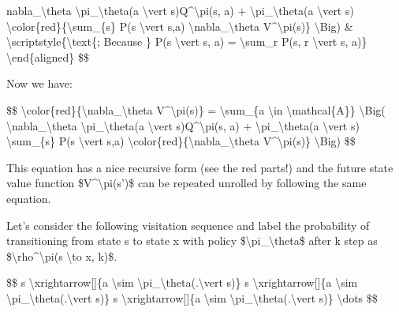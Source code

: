 nabla\_\textbackslash theta \textbackslash pi\_\textbackslash theta(a \textbackslash vert s)Q\^{}\textbackslash pi(s, a) + \textbackslash pi\_\textbackslash theta(a \textbackslash vert s) \textbackslash color\{red\}\{\textbackslash sum\_\{s\textquotesingle\} P(s\textquotesingle{} \textbackslash vert s,a) \textbackslash nabla\_\textbackslash theta V\^{}\textbackslash pi(s\textquotesingle)\} \textbackslash Big) \& \textbackslash scriptstyle\{\textbackslash text\{; Because \} P(s\textquotesingle{} \textbackslash vert s, a) = \textbackslash sum\_r P(s\textquotesingle, r \textbackslash vert s, a)\} \textbackslash end\{aligned\} \$\$

Now we have:

\$\$ \textbackslash color\{red\}\{\textbackslash nabla\_\textbackslash theta V\^{}\textbackslash pi(s)\} = \textbackslash sum\_\{a \textbackslash in \textbackslash mathcal\{A\}\} \textbackslash Big( \textbackslash nabla\_\textbackslash theta \textbackslash pi\_\textbackslash theta(a \textbackslash vert s)Q\^{}\textbackslash pi(s, a) + \textbackslash pi\_\textbackslash theta(a \textbackslash vert s) \textbackslash sum\_\{s\textquotesingle\} P(s\textquotesingle{} \textbackslash vert s,a) \textbackslash color\{red\}\{\textbackslash nabla\_\textbackslash theta V\^{}\textbackslash pi(s\textquotesingle)\} \textbackslash Big) \$\$

This equation has a nice recursive form (see the red parts!) and the future state value function \$V\^{}\textbackslash pi(s')\$ can be repeated unrolled by following the same equation.

Let's consider the following visitation sequence and label the probability of transitioning from state s to state x with policy \$\textbackslash pi\_\textbackslash theta\$ after k step as \$\textbackslash rho\^{}\textbackslash pi(s \textbackslash to x, k)\$.

\$\$ s \textbackslash xrightarrow{[}{]}\{a \textbackslash sim \textbackslash pi\_\textbackslash theta(.\textbackslash vert s)\} s\textquotesingle{} \textbackslash xrightarrow{[}{]}\{a \textbackslash sim \textbackslash pi\_\textbackslash theta(.\textbackslash vert s\textquotesingle)\} s\textquotesingle\textquotesingle{} \textbackslash xrightarrow{[}{]}\{a \textbackslash sim \textbackslash pi\_\textbackslash theta(.\textbackslash vert s\textquotesingle\textquotesingle)\} \textbackslash dots \$\$

